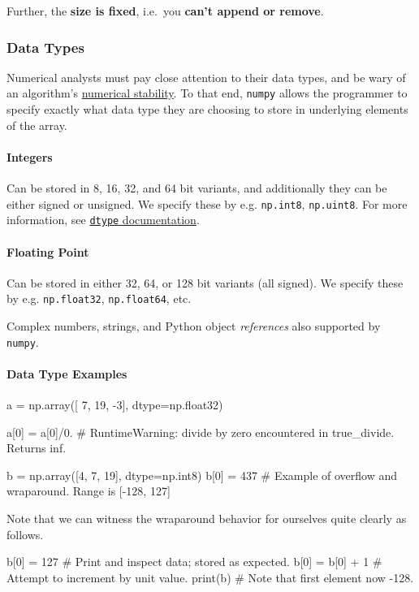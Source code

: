 \documentclass[12pt,letterpaper,twoside]{article}
\begin{document}
Further, the \textbf{size is fixed}, i.e.~you \textbf{can't append or remove}.

\subsubsection{Data Types}
Numerical analysts must pay close attention to their data types, and
be wary of an algorithm's
\href{https://en.wikipedia.org/wiki/Numerical_stability}{numerical
  stability}. To that end, \texttt{numpy} allows the programmer to
specify exactly what data type they are choosing to store in
underlying elements of the array.

\paragraph{Integers}
Can be stored in 8, 16, 32, and 64 bit variants, and additionally they
can be either signed or unsigned. We specify these by
e.g. \texttt{np.int8}, \texttt{np.uint8}. For more information, see
\href{https://docs.scipy.org/doc/numpy/reference/arrays.dtypes.html}
{\texttt{dtype} documentation}.

\paragraph{Floating Point}
Can be stored in either 32, 64, or 128 bit variants (all signed). We
specify these by e.g. \texttt{np.float32}, \texttt{np.float64}, etc.

Complex numbers,
strings, and Python object \emph{references} also supported by \texttt{numpy}.

\paragraph{Data Type Examples}
\begin{python}
a = np.array([ 7, 19, -3], dtype=np.float32)

a[0] = a[0]/0.     # RuntimeWarning: divide by zero encountered in true_divide. Returns inf.

b = np.array([4, 7, 19], dtype=np.int8)
b[0] = 437         # Example of overflow and wraparound. Range is [-128, 127]
\end{python}

Note that we can witness the wraparound behavior for ourselves quite
clearly as follows.

\begin{python}
  b[0] = 127       # Print and inspect data; stored as expected.
  b[0] = b[0] + 1  # Attempt to increment by unit value.
  print(b)         # Note that first element now -128.
\end{python}
\end{document}
